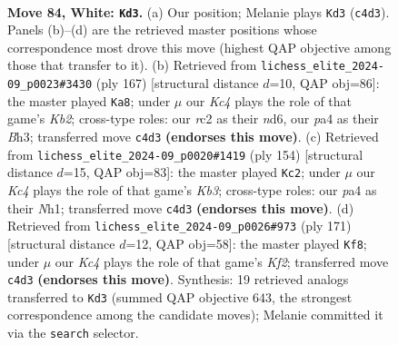 \documentclass[11pt]{article}
\begin{document}
\clearpage

\begin{figure}[p]\centering
\begin{subfigure}{0.46\textwidth}\centering
\resizebox{\linewidth}{!}{%
\newchessgame
\chessboard[
  setfen={8/8/8/2p2k2/p1Kp4/8/2r5/8 w - - 8 84},
  showmover=false,
  pgfstyle=straightmove, color=movearrow, markmove={c4-d3}
]}
\caption{}
\end{subfigure}\hfill
\begin{subfigure}{0.46\textwidth}\centering
\resizebox{\linewidth}{!}{%
\newchessgame
\chessboard[
  setfen={8/1k6/1P1N4/P7/8/2K4b/8/8 b - - 6 84},
  showmover=false,
  pgfstyle=straightmove, color=movearrow, markmove={b7-a8}
]}
\caption{}
\end{subfigure}
\\[4pt]
\begin{subfigure}{0.46\textwidth}\centering
\resizebox{\linewidth}{!}{%
\newchessgame
\chessboard[
  setfen={8/8/8/1k6/1p6/1K1r4/8/7N w - - 6 78},
  showmover=false,
  pgfstyle=straightmove, color=movearrow, markmove={b3-c2}
]}
\caption{}
\end{subfigure}\hfill
\begin{subfigure}{0.46\textwidth}\centering
\resizebox{\linewidth}{!}{%
\newchessgame
\chessboard[
  setfen={8/2R2k2/5P2/6P1/8/1p6/6r1/1K6 b - - 49 86},
  showmover=false,
  pgfstyle=straightmove, color=movearrow, markmove={f7-f8}
]}
\caption{}
\end{subfigure}
\caption{\textbf{Move 84, White: \texttt{Kd3}.} (a) Our position; Melanie plays \texttt{Kd3} (\texttt{c4d3}). Panels (b)--(d) are the retrieved master positions whose correspondence most drove this move (highest QAP objective among those that transfer to it). (b) Retrieved from \texttt{lichess\_elite\_2024-09\_p0023\#3430} (ply 167) [structural distance $d$=10, QAP obj=86]: the master played \texttt{Ka8}; under $\mu$ our \emph{Kc4} plays the role of that game's \emph{Kb2}; cross-type roles: our \emph{r}c2 as their \emph{n}d6, our \emph{p}a4 as their \emph{B}h3; transferred move \texttt{c4d3} \textbf{(endorses this move)}. (c) Retrieved from \texttt{lichess\_elite\_2024-09\_p0020\#1419} (ply 154) [structural distance $d$=15, QAP obj=83]: the master played \texttt{Kc2}; under $\mu$ our \emph{Kc4} plays the role of that game's \emph{Kb3}; cross-type roles: our \emph{p}a4 as their \emph{N}h1; transferred move \texttt{c4d3} \textbf{(endorses this move)}. (d) Retrieved from \texttt{lichess\_elite\_2024-09\_p0026\#973} (ply 171) [structural distance $d$=12, QAP obj=58]: the master played \texttt{Kf8}; under $\mu$ our \emph{Kc4} plays the role of that game's \emph{Kf2}; transferred move \texttt{c4d3} \textbf{(endorses this move)}. Synthesis: 19 retrieved analogs transferred to \texttt{Kd3} (summed QAP objective 643, the strongest correspondence among the candidate moves); Melanie committed it via the \texttt{search} selector.}
\label{fig:thought-m166}
\end{figure}
\end{document}
